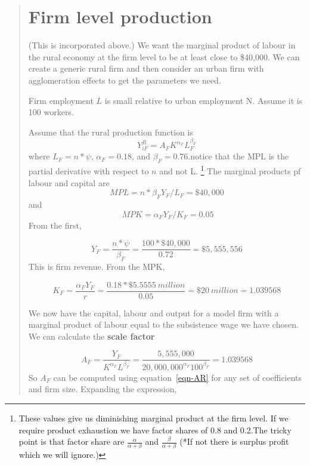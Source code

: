 \begin{quotation} \color{orange}
\section{Firm level production}   
(This is incorporated above.) We want the marginal product of labour in the rural economy at the firm level to be at least close to \$40,000.  We can create a generic rural firm and then consider an urban firm with agglomeration effects to get the parameters we need. 

Firm employment $L$ is small relative to  urban employment {N}. Assume it is 100 workers. 

Assume that the rural production function is 
\[ Y_{iF}^R=A_{F} K^{\alpha_F} L_F^{\beta_F} \]
where  $L_F=n*\psi$, $\alpha_F=0.18 $,  and $\beta_F=0.76$.notice that the MPL is the partial derivative with respect to $n$ and not L. 
\footnote{These values give us diminishing marginal product at the firm level. If we require product exhaustion we have factor shares of  0.8 and 0.2.The tricky point is that factor share are 
 $\frac{\alpha}{\alpha + \beta}$ and $\frac{\beta}{\alpha + \beta}$
(*If not there is surplus profit  which we will ignore.)}   
The marginal products pf labour and capital are 
\[MPL=n*\beta_F Y_F/L_F=\$40,000\] and\[\ MPK=\alpha_F Y_F/K_F =0.05\]
From the first, 

\[Y_F=\frac{n*\psi}{\beta_F}=\frac{100*\$40,000}{0.72}=\$5,555,556\]
This is firm revenue. From the MPK, 

\[K_F=  \frac{\alpha_F Y_F }{r}=\frac{0.18 *\$5.5555\ million}{0.05} =\$20\ million = 1.039568 \]

We now have the capital, labour and output for a model firm with a marginal product of labour  equal to the subsistence wage we have chosen. We can calculate the \textbf{scale factor} 

\begin{equation}  
A_F= \frac{Y_F}{K^{\alpha_F} L^{\beta_F}}=\frac{5,555,000}{20,000,000^{\alpha_F} 100^{\beta_F}} = 1.039568 \label{eqn-AR}\end{equation} 
So $A_F$ can be computed using equation~\ref{eqn-AR} for any set of coefficients and firm size. Expanding the expression,



\end{quotation}
